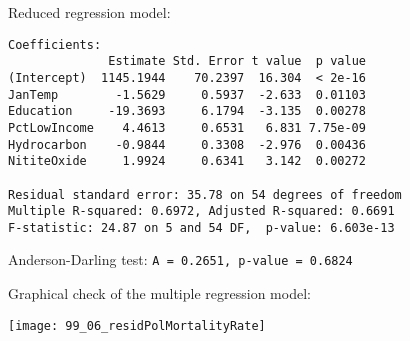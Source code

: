 \begin{frame}[fragile]
  Reduced regression model:
  \begin{small}
    \begin{verbatim}
Coefficients:
              Estimate Std. Error t value  p value
(Intercept)  1145.1944    70.2397  16.304  < 2e-16
JanTemp        -1.5629     0.5937  -2.633  0.01103
Education     -19.3693     6.1794  -3.135  0.00278
PctLowIncome    4.4613     0.6531   6.831 7.75e-09
Hydrocarbon    -0.9844     0.3308  -2.976  0.00436
NititeOxide     1.9924     0.6341   3.142  0.00272

Residual standard error: 35.78 on 54 degrees of freedom
Multiple R-squared: 0.6972,	Adjusted R-squared: 0.6691 
F-statistic: 24.87 on 5 and 54 DF,  p-value: 6.603e-13 
    \end{verbatim}
  \end{small}
  \begin{small}
    Anderson-Darling test: \verb+A = 0.2651, p-value = 0.6824+
  \end{small}
\end{frame}

\begin{frame}
  Graphical check of the multiple regression model:\\
  \vspace{.1cm}
  \begin{center}
    \texttt{[image: 99\_06\_residPolMortalityRate]}
  \end{center}
\end{frame}


